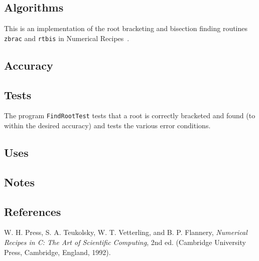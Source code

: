 \documentclass{article}
\begin{document}
\subsection{Algorithms}

This is an implementation of the root bracketing and bisection finding
routines \verb+zbrac+ and \verb+rtbis+ in Numerical Recipes~\cite{ptvf:1992}.

\subsection{Accuracy}

\subsection{Tests}

The program \verb+FindRootTest+ tests that a root is correctly bracketed and
found (to within the desired accuracy) and tests the various error conditions.

\subsection{Uses}

\subsection{Notes}

\subsection{References}
\begin{thebibliography}{0}
  W. H. Press, S. A. Teukolsky, W. T. Vetterling, and B. P. Flannery,
  \textit{Numerical Recipes in C: The Art of Scientific Computing}, 2nd ed.
  (Cambridge University Press, Cambridge, England, 1992).
\end{thebibliography}
\end{document}
